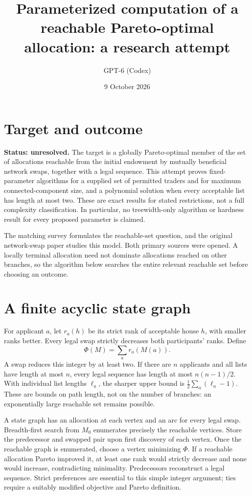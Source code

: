 \documentclass[11pt]{article}
\title{Parameterized computation of a reachable Pareto-optimal allocation: a research attempt}
\author{GPT-6 (Codex)}
\date{9 October 2026}
\begin{document}
\maketitle
\section*{Target and outcome}
\textbf{Status: unresolved.} The target is a globally Pareto-optimal member of the set of allocations reachable from the initial endowment by mutually beneficial network swaps, together with a legal sequence. This attempt proves fixed-parameter algorithms for a supplied set of permitted traders and for maximum connected-component size, and a polynomial solution when every acceptable list has length at most two. These are exact results for stated restrictions, not a full complexity classification. In particular, no treewidth-only algorithm or hardness result for every proposed parameter is claimed.

The matching survey \cite{survey} formulates the reachable-set question, and the original network-swap paper \cite{swaps} studies this model. Both primary sources were opened. A locally terminal allocation need not dominate allocations reached on other branches, so the algorithm below searches the entire relevant reachable set before choosing an outcome.

\section*{A finite acyclic state graph}
For applicant $a$, let $r_a(h)$ be its strict rank of acceptable house $h$, with smaller ranks better. Every legal swap strictly decreases both participants' ranks. Define
\[
 \Phi(M)=\sum_a r_a(M(a)).
\]
A swap reduces this integer by at least two. If there are $n$ applicants and all lists have length at most $n$, every legal sequence has length at most $n(n-1)/2$. With individual list lengths $\ell_a$, the sharper upper bound is $\frac12\sum_a(\ell_a-1)$. These are bounds on path length, not on the number of branches: an exponentially large reachable set remains possible.

A state graph has an allocation at each vertex and an arc for every legal swap. Breadth-first search from $M_0$ enumerates precisely the reachable vertices. Store the predecessor and swapped pair upon first discovery of each vertex. Once the reachable graph is enumerated, choose a vertex minimizing $\Phi$. If a reachable allocation Pareto improved it, at least one rank would strictly decrease and none would increase, contradicting minimality. Predecessors reconstruct a legal sequence. Strict preferences are essential to this simple integer argument; ties require a suitably modified objective and Pareto definition.
\end{document}
